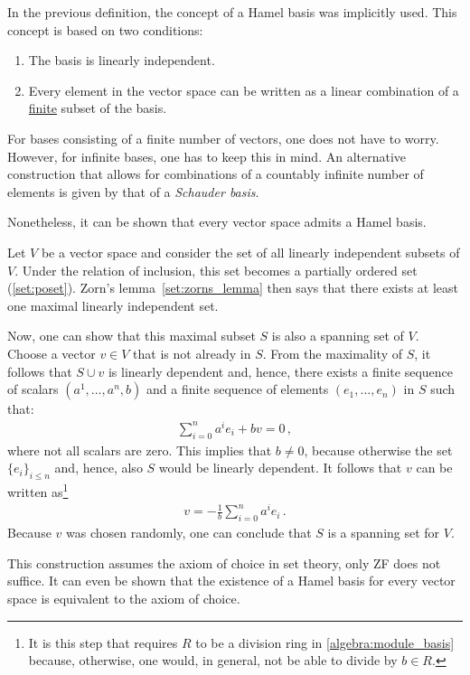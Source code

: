     \begin{remark}\label{linalgebra:hamel_remark}
        In the previous definition, the concept of a Hamel basis was implicitly used. This concept is based on two conditions:
        \begin{enumerate}
            \item The basis is linearly independent.
            \item Every element in the vector space can be written as a linear combination of a \underline{finite} subset of the basis.
        \end{enumerate}
        For bases consisting of a finite number of vectors, one does not have to worry. However, for infinite bases, one has to keep this in mind. An alternative construction that allows for combinations of a countably infinite number of elements is given by that of a \textit{Schauder basis}.
    \end{remark}
    Nonetheless, it can be shown that every vector space admits a Hamel basis.
    \begin{construct}\label{linalgebra:hamel_basis}
        Let $V$ be a vector space and consider the set of all linearly independent subsets of $V$. Under the relation of inclusion, this set becomes a partially ordered set (\cref{set:poset}). Zorn's lemma~\ref{set:zorns_lemma} then says that there exists at least one maximal linearly independent set.

        Now, one can show that this maximal subset $S$ is also a spanning set of $V$. Choose a vector $v\in V$ that is not already in $S$. From the maximality of $S$, it follows that $S\cup v$ is linearly dependent and, hence, there exists a finite sequence of scalars $(a^1,\ldots,a^n,b)$ and a finite sequence of elements $(e_1,\ldots,e_n)$ in $S$ such that:
        \begin{gather}
            \sum_{i=0}^n a^ie_i + bv = 0\,,
        \end{gather}
        where not all scalars are zero. This implies that $b\neq0$, because otherwise the set $\{e_i\}_{i\leq n}$ and, hence, also $S$ would be linearly dependent. It follows that $v$ can be written as\footnote{It is this step that requires $R$ to be a division ring in \cref{algebra:module_basis} because, otherwise, one would, in general, not be able to divide by $b\in R$.}
        \begin{gather}
            v = -\frac{1}{b}\sum_{i=0}^na^ie_i\,.
        \end{gather}
        Because $v$ was chosen randomly, one can conclude that $S$ is a spanning set for $V$.
    \end{construct}
    \begin{remark*}
        This construction assumes the axiom of choice in set theory, only ZF does not suffice. It can even be shown that the existence of a Hamel basis for every vector space is equivalent to the axiom of choice.
    \end{remark*}

